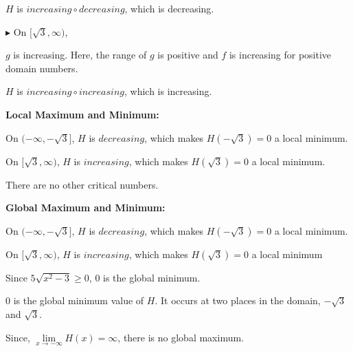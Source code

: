 \documentclass{ximera}
\begin{document}
\begin{center}
$H$ is $increasing \circ decreasing$, which is decreasing. 
\end{center}





\textbf{\textcolor{blue!55!black}{$\blacktriangleright$}} On $[\sqrt{3}, \infty)$, 


$g$ is increasing. Here, the range of $g$ is positive and $f$ is increasing for positive domain numbers. 


\begin{center}
$H$ is $increasing \circ increasing$, which is increasing. 
\end{center}













\textbf{\textcolor{blue!55!black}{Local Maximum and Minimum:}} 





On $(-\infty, -\sqrt{3} ]$, $H$ is $decreasing$, which makes $H(-\sqrt{3}) = 0$ a local minimum.  


On $[ \sqrt{3}, \infty)$, $H$ is $increasing$, which makes $H(\sqrt{3}) = 0$ a local minimum.  



There are no other critical numbers.









\textbf{\textcolor{blue!55!black}{Global Maximum and Minimum:}} 



On $(-\infty, -\sqrt{3} ]$, $H$ is $decreasing$, which makes $H(-\sqrt{3}) = 0$ a local minimum. 


On $[ \sqrt{3}, \infty)$, $H$ is $increasing$, which makes $H(\sqrt{3}) = 0$ a local minimum  




Since $5 \sqrt{x^2-3} \geq 0$, $0$ is the global minimum. 



$0$ is the global minimum value of $H$. It occurs at two places in the domain, $-\sqrt{3}$ and $\sqrt{3}$. 



Since, $\lim\limits_{x \to -\infty} H(x) = \infty$, there is no global maximum. 
\end{document}
